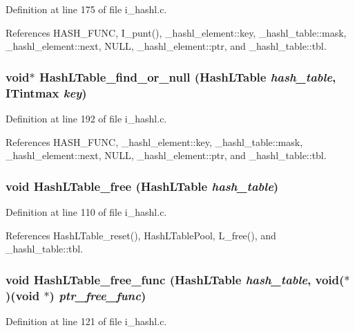 Definition at line 175 of file i\_\-hashl.c.

References HASH\_\-FUNC, I\_\-punt(), \_\-hashl\_\-element::key, \_\-hashl\_\-table::mask, \_\-hashl\_\-element::next, NULL, \_\-hashl\_\-element::ptr, and \_\-hashl\_\-table::tbl.
\subsubsection{\setlength{\rightskip}{0pt plus 5cm}void$\ast$ Hash\-LTable\_\-find\_\-or\_\-null (\bf{Hash\-LTable} {\em hash\_\-table}, \bf{ITintmax} {\em key})}\label{i__hashl_8c_73d4f4d209b3012388d5fc5c21e3cbc9}




Definition at line 192 of file i\_\-hashl.c.

References HASH\_\-FUNC, \_\-hashl\_\-element::key, \_\-hashl\_\-table::mask, \_\-hashl\_\-element::next, NULL, \_\-hashl\_\-element::ptr, and \_\-hashl\_\-table::tbl.
\subsubsection{\setlength{\rightskip}{0pt plus 5cm}void Hash\-LTable\_\-free (\bf{Hash\-LTable} {\em hash\_\-table})}\label{i__hashl_8c_b165d08c368e2dc631242d87b88707f1}




Definition at line 110 of file i\_\-hashl.c.

References Hash\-LTable\_\-reset(), Hash\-LTable\-Pool, L\_\-free(), and \_\-hashl\_\-table::tbl.
\subsubsection{\setlength{\rightskip}{0pt plus 5cm}void Hash\-LTable\_\-free\_\-func (\bf{Hash\-LTable} {\em hash\_\-table}, void($\ast$)(void $\ast$) {\em ptr\_\-free\_\-func})}\label{i__hashl_8c_044024d3dccd7952ebb356bb73f2cd64}




Definition at line 121 of file i\_\-hashl.c.

